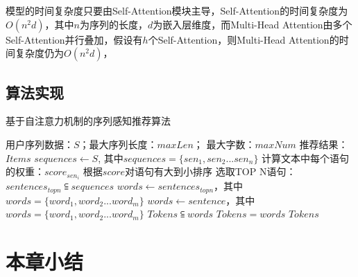 模型的时间复杂度只要由Self-Attention模块主导，Self-Attention的时间复杂度为$O(n^{2} d)$，其中$n$为序列的长度，$d$为嵌入层维度，而Multi-Head Attention由多个Self-Attention并行叠加，假设有$h$个Self-Attention，则Multi-Head Attention的时间复杂度仍为$O(n^{2} d)$，




\subsection{算法实现}
\begin{algorithm}[htbp]
	\caption{基于自注意力机制的序列感知推荐算法}
	\label{alg:self-attention}
		\begin{algorithmic}[1]
			\REQUIRE 用户序列数据：$S$；最大序列长度：$maxLen$； 最大字数：$maxNum$
			\ENSURE 推荐结果：$Items$
			\STATE $sequences \leftarrow S$, 其中$sequences=\{sen_{1}, sen_{2}...sen_{n}\}$
			    \STATE 计算文本中每个语句的权重：$score_{sen_{i}}$
			  \ENDFOR
			  \STATE 根据$score$对语句有大到小排序
			  \STATE 选取TOP N语句：$sentences_{topn} \subseteqq sequences$
			  \STATE $words \leftarrow sentences_{topn}$，其中 $words=\{word_{1}, word_{2}...word_{m}\}$
			\ELSE
			  \STATE $words \leftarrow sentence$，其中 $words=\{word_{1}, word_{2}...word_{m}\}$
			\ENDIF
			  \STATE $Tokens \subseteqq words$
			\ELSE
			  \STATE $Tokens = words $
			\ENDIF
			\RETURN $Tokens$
		\end{algorithmic}
\end{algorithm}


\section{本章小结}



